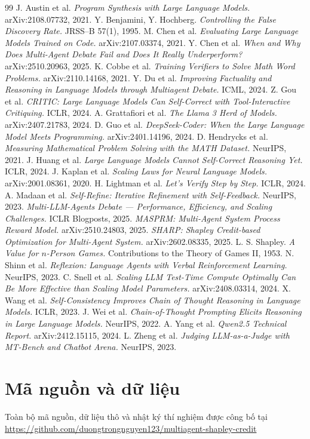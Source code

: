 \documentclass[11pt,a4paper]{article}
\begin{document}
\begin{thebibliography}{99}\small
{} J. Austin et al. \emph{Program Synthesis with Large Language Models.}
arXiv:2108.07732, 2021.
 Y. Benjamini, Y. Hochberg. \emph{Controlling the False Discovery Rate.}
JRSS--B 57(1), 1995.
 M. Chen et al. \emph{Evaluating Large Language Models Trained on Code.}
arXiv:2107.03374, 2021.
 Y. Chen et al. \emph{When and Why Does Multi-Agent Debate Fail and Does It
Really Underperform?} arXiv:2510.20963, 2025.
 K. Cobbe et al. \emph{Training Verifiers to Solve Math Word Problems.}
arXiv:2110.14168, 2021.
 Y. Du et al. \emph{Improving Factuality and Reasoning in Language Models
through Multiagent Debate.} ICML, 2024.
 Z. Gou et al. \emph{CRITIC: Large Language Models Can Self-Correct with
Tool-Interactive Critiquing.} ICLR, 2024.
 A. Grattafiori et al. \emph{The Llama 3 Herd of Models.}
arXiv:2407.21783, 2024.
 D. Guo et al. \emph{DeepSeek-Coder: When the Large Language Model Meets
Programming.} arXiv:2401.14196, 2024.
 D. Hendrycks et al. \emph{Measuring Mathematical Problem Solving with
the MATH Dataset.} NeurIPS, 2021.
 J. Huang et al. \emph{Large Language Models Cannot Self-Correct Reasoning
Yet.} ICLR, 2024.
 J. Kaplan et al. \emph{Scaling Laws for Neural Language Models.}
arXiv:2001.08361, 2020.
 H. Lightman et al. \emph{Let's Verify Step by Step.} ICLR, 2024.
 A. Madaan et al. \emph{Self-Refine: Iterative Refinement with
Self-Feedback.} NeurIPS, 2023.
 \emph{Multi-LLM-Agents Debate --- Performance, Efficiency, and Scaling
Challenges.} ICLR Blogposts, 2025.
 \emph{MASPRM: Multi-Agent System Process Reward Model.} arXiv:2510.24803,
2025.
 \emph{SHARP: Shapley Credit-based Optimization for Multi-Agent System.}
arXiv:2602.08335, 2025.
 L. S. Shapley. \emph{A Value for $n$-Person Games.} Contributions to the
Theory of Games II, 1953.
 N. Shinn et al. \emph{Reflexion: Language Agents with Verbal Reinforcement
Learning.} NeurIPS, 2023.
 C. Snell et al. \emph{Scaling LLM Test-Time Compute Optimally Can Be More
Effective than Scaling Model Parameters.} arXiv:2408.03314, 2024.
 X. Wang et al. \emph{Self-Consistency Improves Chain of Thought Reasoning in
Language Models.} ICLR, 2023.
 J. Wei et al. \emph{Chain-of-Thought Prompting Elicits Reasoning in Large
Language Models.} NeurIPS, 2022.
 A. Yang et al. \emph{Qwen2.5 Technical Report.} arXiv:2412.15115, 2024.
 L. Zheng et al. \emph{Judging LLM-as-a-Judge with MT-Bench and Chatbot
Arena.} NeurIPS, 2023.
\end{thebibliography}

\appendix
\section*{Mã nguồn và dữ liệu}
Toàn bộ mã nguồn, dữ liệu thô và nhật ký thí nghiệm được công bố tại\\
\url{https://github.com/duongtrongnguyen123/multiagent-shapley-credit}
\end{document}
